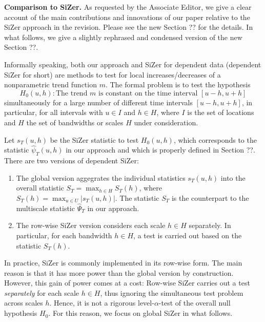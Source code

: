 \documentclass[a4paper,12pt]{article}
\begin{document}
\textbf{Comparison to SiZer.} As requested by the Associate Editor, we give a clear account of the main contributions and innovations of our paper relative to the SiZer approach in the revision. Please see the new Section ?? for the details. In what follows, we give a slightly rephrased and condensed version of the new Section ??. 


Informally speaking, both our approach and SiZer for dependent data (dependent SiZer for short) are methods to test for local increases/decreases of a nonparametric trend function $m$. The formal problem is to test the hypothesis
\[ H_0(u,h): \text{The trend } m \text{ is constant on the time interval } [u-h,u+h] \]
simultaneously for a large number of different time intervals $[u-h,u+h]$, in particular, for all intervals with $u \in I$ and $h \in H$, where $I$ is the set of locations and $H$ the set of bandwidths or scales $H$ under consideration. 


Let $s_T(u,h)$ be the SiZer statistic to test $H_0(u,h)$, which corresponds to the statistic $\widehat{\psi}_T(u,h)$ in our approach and which is properly defined in Section ??. There are two versions of dependent SiZer: 
\begin{enumerate}[label=(\alph*), leftmargin=0.8cm]

\item The global version aggegrates the individual statistics $s_T(u,h)$ into the overall statistic $S_T = \max_{h \in H} S_T(h)$, where $S_T(h) = \max_{u \in U} |s_T(u,h)|$. The statistic $S_T$ is the counterpart to the multiscale statistic $\widehat{\Psi}_T$ in our approach. 

\item The row-wise SiZer version considers each scale $h \in H$ separately. In particular, for each bandwidth $h \in H$, a test is carried out based on the statistic $S_T(h)$. 

\end{enumerate}
In practice, SiZer is commonly implemented in its row-wise form. The main reason is that it has more power than the global version by construction. However, this gain of power comes at a cost: Row-wise SiZer carries out a test \textit{separately} for each scale $h \in H$, thus ignoring the simultaneous test problem across scales $h$. Hence, it is not a rigorous level-$\alpha$-test of the overall null hypothesis $H_0$. For this reason, we focus on global SiZer in what follows. 
\end{document}
